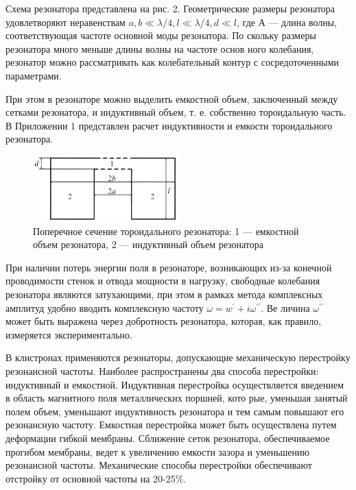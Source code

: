 Схема резонатора представлена на рис. 2. Геометрические размеры ре­зонатора удовлетворяют неравенствам 
$a , b \ll \lambda / 4 , l \ll \lambda / 4 , d \ll l$, где
А — длина волны, соответствующая частоте основной моды резонатора. По­
скольку размеры резонатора много меньше длины волны на частоте основ­
ного колебания, резонатор можно рассматривать как колебательный контур
с сосредоточенными параметрами.

При этом в резонаторе можно выделить емкостной объем, заключенный
между сетками резонатора, и индуктивный объем, т. е. собственно торои­дальную часть. В Приложении 1 представлен расчет индуктивности и емко­сти тороидального резонатора.

\begin{figure}[h!]
	\centering
	\includegraphics[width=0.5\textwidth]{fig/fig2}
	\caption{Поперечное сечение тороидального резонатора: 1 — емкостной объем резонатора, 2 — индуктивный объем резонатора}
	\label{fig:2}
\end{figure}

При наличии потерь энергии поля в резонаторе, возникающих из-за ко­нечной проводимости стенок и отвода мощности в нагрузку, свободные ко­лебания резонатора являются затухающими, при этом в рамках метода ком­плексных амплитуд удобно вводить комплексную частоту 
$\omega = w ^ { \prime } + i \omega ^ { \prime \prime }$. Ве­
личина $\omega ^ { \prime \prime }$ может быть выражена через добротность резонатора, которая,
как правило, измеряется экспериментально.

В клистронах применяются резонаторы, допускающие механическую пе­рестройку резонансной частоты. Наиболее распространены два способа пе­рестройки: индуктивный и емкостной. Индуктивная перестройка осуществ­ляется введением в область магнитного поля металлических поршней, кото­
рые, уменьшая занятый полем объем, уменьшают индуктивность резонато­ра и тем самым повышают его резонансную частоту. Емкостная перестройка
может быть осуществлена путем деформации гибкой мембраны. Сближение
сеток резонатора, обеспечиваемое прогибом мембраны, ведет к увеличению
емкости зазора и уменьшению резонансной частоты. Механические способы
перестройки обеспечивают отстройку от основной частоты на 20-25\%.
